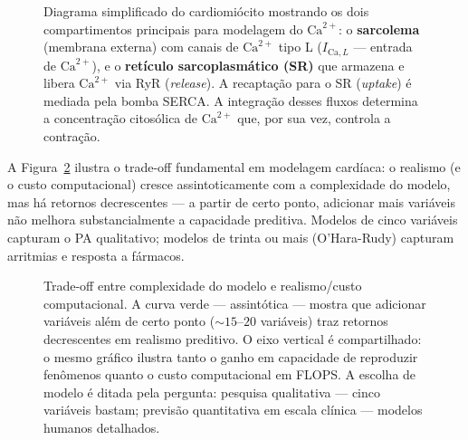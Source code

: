 \begin{figure}[htbp]
\centering
{}
\caption{Diagrama simplificado do cardiomiócito mostrando os dois compartimentos principais para modelagem do $\mathrm{Ca}^{2+}$: o \textbf{sarcolema} (membrana externa) com canais de $\mathrm{Ca}^{2+}$ tipo L ($I_{\mathrm{Ca},L}$ --- entrada de $\mathrm{Ca}^{2+}$), e o \textbf{retículo sarcoplasmático (SR)} que armazena e libera $\mathrm{Ca}^{2+}$ via RyR (\emph{release}). A recaptação para o SR (\emph{uptake}) é mediada pela bomba SERCA. A integração desses fluxos determina a concentração citosólica de $\mathrm{Ca}^{2+}$ que, por sua vez, controla a contração.}
\label{fig:12-celula-sr}
\end{figure}

A Figura~\ref{fig:12-tradeoff} ilustra o trade-off fundamental em
modelagem cardíaca: o realismo (e o custo computacional) cresce
assintoticamente com a complexidade do modelo, mas há retornos
decrescentes --- a partir de certo ponto, adicionar mais variáveis não
melhora substancialmente a capacidade preditiva. Modelos de cinco
variáveis capturam o PA qualitativo; modelos de trinta ou mais
(O'Hara-Rudy) capturam arritmias e resposta a fármacos.

\begin{figure}[htbp]
\centering
{}
\caption{Trade-off entre complexidade do modelo e realismo/custo computacional. A curva verde --- assintótica --- mostra que adicionar variáveis além de certo ponto ($\sim 15$--$20$ variáveis) traz retornos decrescentes em realismo preditivo. O eixo vertical é compartilhado: o mesmo gráfico ilustra tanto o ganho em capacidade de reproduzir fenômenos quanto o custo computacional em FLOPS. A escolha de modelo é ditada pela pergunta: pesquisa qualitativa --- cinco variáveis bastam; previsão quantitativa em escala clínica --- modelos humanos detalhados.}
\label{fig:12-tradeoff}
\end{figure}


